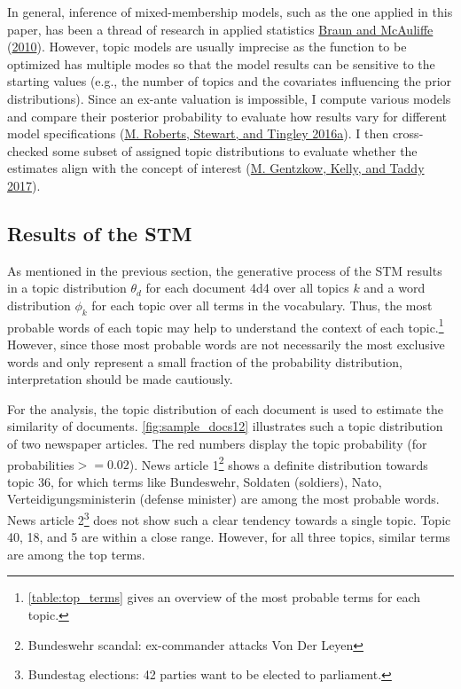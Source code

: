 \documentclass[
  12pt,
]{article}
\begin{document}
In general, inference of mixed-membership models, such as the one
applied in this paper, has been a thread of research in applied
statistics \protect\hyperlink{ref-braun_variational_2010}{Braun and
McAuliffe} (\protect\hyperlink{ref-braun_variational_2010}{2010}).
However, topic models are usually imprecise as the function to be
optimized has multiple modes so that the model results can be sensitive
to the starting values (e.g., the number of topics and the covariates
influencing the prior distributions). Since an ex-ante valuation is
impossible, I compute various models and compare their posterior
probability to evaluate how results vary for different model
specifications (\protect\hyperlink{ref-roberts_navigating_2016}{M.
Roberts, Stewart, and Tingley 2016a}). I then cross-checked some subset
of assigned topic distributions to evaluate whether the estimates align
with the concept of interest
(\protect\hyperlink{ref-gentzkow_text_2017}{M. Gentzkow, Kelly, and
Taddy 2017}).

\hypertarget{results-of-the-stm}{%
\subsection{Results of the STM}\label{results-of-the-stm}}

As mentioned in the previous section, the generative process of the STM
results in a topic distribution \(\theta_d\) for each document 4d4 over
all topics \(k\) and a word distribution \(\phi_k\) for each topic over
all terms in the vocabulary. Thus, the most probable words of each topic
may help to understand the context of each topic.\footnote{\autoref{table:top_terms}
  gives an overview of the most probable terms for each topic.} However,
since those most probable words are not necessarily the most exclusive
words and only represent a small fraction of the probability
distribution, interpretation should be made cautiously.

For the analysis, the topic distribution of each document is used to
estimate the similarity of documents. \autoref{fig:sample_docs12}
illustrates such a topic distribution of two newspaper articles. The red
numbers display the topic probability (for probabilities\(>= 0.02\)).
News article 1\footnote{Bundeswehr scandal: ex-commander attacks Von Der
  Leyen} shows a definite distribution towards topic 36, for which terms
like Bundeswehr, Soldaten (soldiers), Nato, Verteidigungsministerin
(defense minister) are among the most probable words. News article
2\footnote{Bundestag elections: 42 parties want to be elected to
  parliament.} does not show such a clear tendency towards a single
topic. Topic 40, 18, and 5 are within a close range. However, for all
three topics, similar terms are among the top terms.
\end{document}
